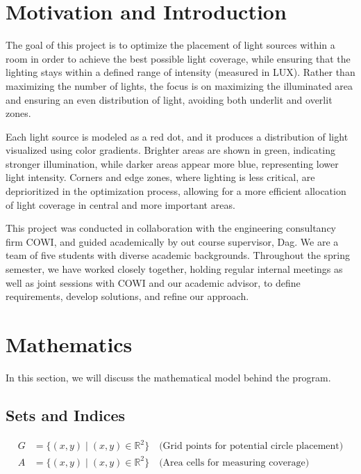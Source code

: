 \documentclass{article}
\begin{document}
\newpage

\section{Motivation and Introduction}

The goal of this project is to optimize the placement of light sources within a room in order to achieve the best possible light coverage, while 
ensuring that the lighting stays within a defined range of intensity (measured in LUX). Rather than maximizing the number of lights, the focus is on 
maximizing the illuminated area and ensuring an even distribution of light, avoiding both underlit and overlit zones.

Each light source is modeled as a red dot, and it produces a distribution of light visualized using color gradients. Brighter areas are shown in green, 
indicating stronger illumination, while darker areas appear more blue, representing lower light intensity. Corners and edge zones, where lighting is less critical, 
are deprioritized in the optimization process, allowing for a more efficient allocation of light coverage in central and more important areas.

This project was conducted in collaboration with the engineering consultancy firm COWI, and guided academically by out course supervisor, Dag. We are a team of five 
students with diverse academic backgrounds. Throughout the spring semester, we have worked closely together, holding regular internal meetings as well as joint sessions 
with COWI and our academic advisor, to define requirements, develop solutions, and refine our approach.


\newpage

\section{Mathematics}

In this section, we will discuss the mathematical model behind the program.

\subsection{Sets and Indices}
\begin{align}
    G &= \{(x, y) \mid (x, y) \in \mathbb{R}^2\} \quad \text{(Grid points for potential circle placement)}\\
    A &= \{(x, y) \mid (x, y) \in \mathbb{R}^2\} \quad \text{(Area cells for measuring coverage)}
\end{align}
\end{document}
